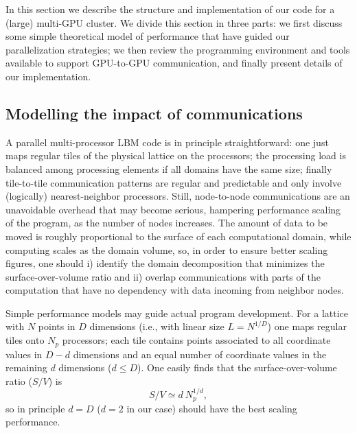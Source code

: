 \documentclass{elsarticle}
\begin{document}
In this section we describe the structure and implementation of our code
for a (large) multi-GPU cluster.
%
%
We divide this section in three parts:
we first discuss some simple theoretical model of performance that have 
guided our parallelization strategies; we then review the programming 
environment and tools available to support GPU-to-GPU communication, 
and finally present details of our implementation.


\subsection*{Modelling the impact of communications}

A parallel multi-processor LBM code is in principle 
straightforward: one just maps regular tiles of the physical lattice on 
the processors; the processing load is balanced among processing elements 
if all domains have the same size; finally tile-to-tile 
communication patterns are regular and predictable and only involve 
(logically) nearest-neighbor processors.
% 
Still, node-to-node communications are an unavoidable overhead that may 
become serious, hampering performance scaling of the program, as the number 
of nodes increases. 
%
The amount of data to be moved is roughly proportional to the surface of each
computational domain, while computing scales as the domain volume, so, in 
order to ensure better scaling figures, one should
i) identify the domain decomposition that minimizes the surface-over-volume ratio
and ii) overlap communications with parts of the computation that have no
dependency with data incoming from neighbor nodes.

Simple performance models may guide actual 
program development. For a lattice with $N$ points in $D$ dimensions 
(i.e., with linear size $L = N^{1/D}$) one maps regular tiles onto $N_p$ processors;
each tile contains points associated to all coordinate values in
$D - d$ dimensions and an equal number of coordinate values in the remaining $d$ 
dimensions ($d \le D$). 
%
One easily finds that the surface-over-volume ratio ($S/V$) is
%
\begin{equation}
S/V \simeq d ~ N_p^{1/d},
\end{equation}
%
so in principle $d  = D$ ($d = 2$ in our case) should have the best scaling
performance. 
\end{document}
